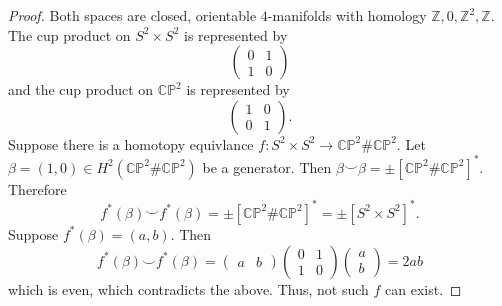 \begin{proof}
    Both spaces are closed, orientable $4$-manifolds with homology $\mathbb Z, 0, \mathbb Z^2, \mathbb Z$. The cup product on $S^2 \times S^2$ is represented by
    \[ \begin{pmatrix}
        0 & 1 \\ 1 & 0
    \end{pmatrix} \]
    and the cup product on $\mathbb C \mathbb P^2$ is represented by
    \[ \begin{pmatrix}
        1 & 0 \\ 0 & 1
    \end{pmatrix}.\]
    Suppose there is a homotopy equivlance $f: S^2 \times S^2 \to \mathbb C \mathbb P^2 \# \mathbb C \mathbb P^2$. Let $\beta = (1, 0) \in H^2(\mathbb C \mathbb P^2 \# \mathbb C \mathbb P^2)$ be a generator. Then $\beta \smile \beta = \pm[\mathbb C \mathbb P^2 \# \mathbb C \mathbb P^2]^*$. Therefore
    \[ f^*(\beta) \smile f^*(\beta) = \pm[\mathbb C \mathbb P^2 \# \mathbb C \mathbb P^2]^* = \pm[S^2 \times S^2]^*. \]
    Suppose $f^*(\beta) = (a,b)$. Then
    \[ f^*(\beta) \smile f^*(\beta) = \begin{pmatrix}
        a & b
    \end{pmatrix}
    \begin{pmatrix}
        0 & 1 \\ 1 & 0
    \end{pmatrix}
    \begin{pmatrix}
        a \\ b
    \end{pmatrix} = 2ab \]
    which is even, which contradicts the above. Thus, not such $f$ can exist. 
\end{proof}
